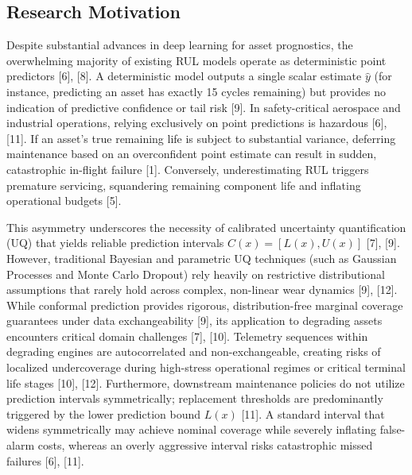 \documentclass[12pt,a4paper]{article}
\begin{document}
\subsection{Research Motivation}
Despite substantial advances in deep learning for asset prognostics, the overwhelming majority of existing RUL models operate as deterministic point predictors [6], [8]. A deterministic model outputs a single scalar estimate $\hat{y}$ (for instance, predicting an asset has exactly 15 cycles remaining) but provides no indication of predictive confidence or tail risk [9]. In safety-critical aerospace and industrial operations, relying exclusively on point predictions is hazardous [6], [11]. If an asset's true remaining life is subject to substantial variance, deferring maintenance based on an overconfident point estimate can result in sudden, catastrophic in-flight failure [1]. Conversely, underestimating RUL triggers premature servicing, squandering remaining component life and inflating operational budgets [5].

This asymmetry underscores the necessity of calibrated uncertainty quantification (UQ) that yields reliable prediction intervals $C(x) = [L(x), U(x)]$ [7], [9]. However, traditional Bayesian and parametric UQ techniques (such as Gaussian Processes and Monte Carlo Dropout) rely heavily on restrictive distributional assumptions that rarely hold across complex, non-linear wear dynamics [9], [12]. While conformal prediction provides rigorous, distribution-free marginal coverage guarantees under data exchangeability [9], its application to degrading assets encounters critical domain challenges [7], [10]. Telemetry sequences within degrading engines are autocorrelated and non-exchangeable, creating risks of localized undercoverage during high-stress operational regimes or critical terminal life stages [10], [12]. Furthermore, downstream maintenance policies do not utilize prediction intervals symmetrically; replacement thresholds are predominantly triggered by the lower prediction bound $L(x)$ [11]. A standard interval that widens symmetrically may achieve nominal coverage while severely inflating false-alarm costs, whereas an overly aggressive interval risks catastrophic missed failures [6], [11].
\end{document}
